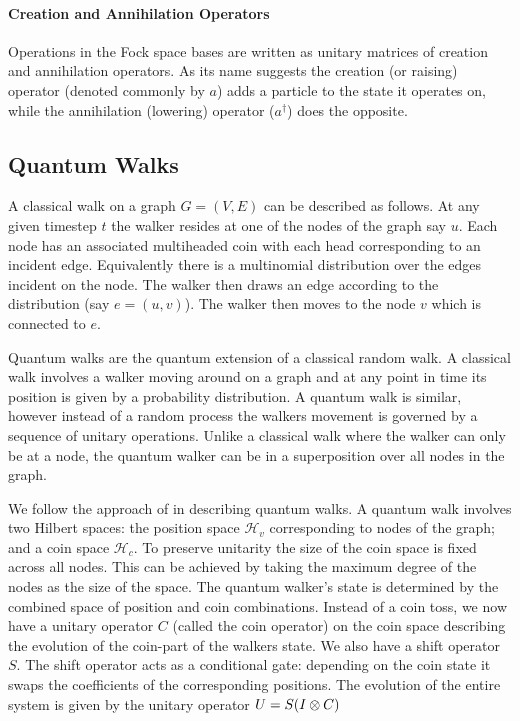 \documentclass{article}
\begin{document}
\paragraph{Creation and Annihilation Operators}
Operations in the Fock space bases are written as unitary matrices of creation and annihilation operators. As its name suggests the creation (or raising) operator (denoted commonly by $a$) adds a particle to the state it operates on, while the annihilation (lowering) operator ($a^\dagger$) does the opposite. \\


\subsection{Quantum Walks}
A classical walk on a graph $G=(V,E)$ can be described as follows. At any given timestep $t$ the walker resides at one of the nodes of the graph say $u$. Each node has an associated multiheaded coin with each head corresponding to an incident edge. Equivalently there is a multinomial distribution over the edges incident on the node. The walker then draws an edge according to the distribution (say $e = (u,v)$). The walker then moves to the node $v$ which is connected to $e$.

Quantum walks are the quantum extension of a classical random walk.
A classical walk involves a walker moving around on a graph and at any point in time its position is given by a probability distribution. A quantum walk is similar, however instead of a random process the walkers movement is governed by a sequence of unitary operations. Unlike a classical walk where the walker can only be at a node, the quantum walker can be in a superposition over all nodes in the graph. 

%

We follow the approach of \cite{kendon06_walks} in describing quantum walks. A quantum walk involves two Hilbert spaces: the position space $\mathcal{H}_v$ corresponding to nodes of the graph; and a coin space $\mathcal{H}_c$. To preserve unitarity the size of the coin space is fixed across all nodes. This can be achieved by taking the maximum degree of the nodes as the size of the space.
The quantum walker's state is determined by the combined space of position and coin combinations. Instead of a coin toss, we now have a unitary operator $C$ (called the coin operator) on the coin space describing the evolution of the coin-part of the walkers state. We also have a shift operator $S$. The shift operator acts as a conditional gate: depending on the coin state it swaps the coefficients of the corresponding positions. The evolution of the entire system is given by the unitary operator $U = S(I\tens C)$
\end{document}
